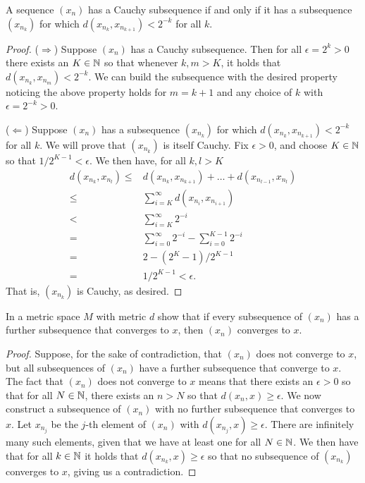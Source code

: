 \begin{exercise}{38}
A sequence $(x_n)$ has a Cauchy subsequence if and only if it has a subsequence $(x_{n_k})$ for which $d(x_{n_k},x_{n_{k+1}})<2^{-k}$ for all $k$.
\end{exercise}
\begin{proof}
($\Rightarrow$) 
Suppose $(x_n)$ has a Cauchy subsequence. 
Then for all $\epsilon=2^k>0$ there exists an $K\in\mathbb{N}$ so that whenever $k,m>K$, it holds that $d(x_{n_k},x_{n_{m}})<2^{-k}$.
We can build the subsequence with the desired property noticing the above property holds for $m=k+1$ and any choice of $k$ with $\epsilon=2^{-k}>0$.

($\Leftarrow$)
Suppose $(x_n)$ has a subsequence $(x_{n_k})$ for which $d(x_{n_k},x_{n_{k+1}})<2^{-k}$ for all $k$. 
We will prove that $(x_{n_k})$ is itself Cauchy. 
Fix $\epsilon>0$, and choose $K\in\mathbb{N}$ so that $1/2^{K-1}<\epsilon$. 
We then have, for all $k,l>K$
\begin{align*}
    d(x_{n_k},x_{n_l}) 
    \leq& d(x_{n_k},x_{n_{k+1}})+\dots+d(x_{n_{l-1}},x_{n_l})\\
    \leq& \sum_{i=K}^\infty d(x_{n_i},x_{n_{i+1}})\\
    <& \sum_{i=K}^\infty 2^{-i}\\
    =& \sum_{i=0}^\infty 2^{-i}-\sum_{i=0}^{K-1}2^{-i}\\
    =& 2-(2^K-1)/2^{K-1}\\
    =& 1/2^{K-1}<\epsilon.
\end{align*}
That is, $(x_{n_k})$ is Cauchy, as desired.
\end{proof} 

\begin{exercise}{39}
In a metric space $M$ with metric $d$ show that if every subsequence of $(x_n)$ has a further subsequence that converges to $x$, then $(x_n)$ converges to $x$.
\end{exercise}
\begin{proof}
Suppose, for the sake of contradiction, that $(x_n)$ does not converge to $x$, but all subsequences of $(x_n)$ have a further subsequence that converge to $x$. The fact that $(x_n)$ does not converge to $x$ means that there exists an $\epsilon>0$ so that for all $N\in\mathbb{N}$, there exists an $n>N$ so that $d(x_n,x)\geq\epsilon$. We now construct a subsequence of $(x_n)$ with no further subsequence that converges to $x$. Let $x_{n_j}$ be the $j$-th element of $(x_n)$ with $d(x_{n_j},x)\geq\epsilon$. There are infinitely many such elements, given that we have at least one for all $N\in\mathbb{N}$. We then have that for all $k\in\mathbb{N}$ it holds that $d(x_{n_k},x)\geq\epsilon$ so that no subsequence of $(x_{n_k})$ converges to $x$, giving us a contradiction.
\end{proof} 

